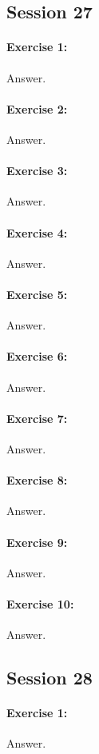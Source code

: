\documentclass{article}
\begin{document}
\subsection*{Session 27}
\paragraph{Exercise 1:}
Answer.
\paragraph{Exercise 2:}
Answer.
\paragraph{Exercise 3:}
Answer.
\paragraph{Exercise 4:}
Answer.
\paragraph{Exercise 5:}
Answer.
\paragraph{Exercise 6:}
Answer.
\paragraph{Exercise 7:}
Answer.
\paragraph{Exercise 8:}
Answer.
\paragraph{Exercise 9:}
Answer.
\paragraph{Exercise 10:}
Answer.
\newpage

\subsection*{Session 28}
\paragraph{Exercise 1:}
Answer.
\end{document}
